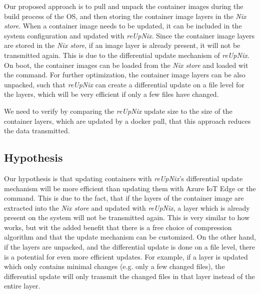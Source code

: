 Our proposed approach is to pull and unpack the container images during the build
process of the \ac{OS}, and then storing the container image layers in the
\textit{Nix store}. When a container image needs to be updated, it can
be included in the system configuration and updated with \textit{reUpNix}.
Since the container image layers are stored in the \textit{Nix store}, if an
image layer is already present, it will not be transmitted again. This is due
to the differential update mechanism of \textit{reUpNix}.
On boot, the container images can be loaded from the \textit{Nix store} and
loaded wit the  command.
For further optimization, the container image layers can be also unpacked,
such that \textit{reUpNix} can create a differential update on a file level for
the layers, which will be very efficient if only a few files have changed.

We need to verify by comparing the \textit{reUpNix} update size to the size of the container layers,
which are updated by a docker pull, that this approach reduces the data transmitted.

\subsection{Hypothesis}
Our hypothesis is that updating containers with \textit{reUpNix}'s differential
update mechanism will be more efficient than updating them with Azure IoT Edge or
the  command. This is due to the fact, that if the
layers of the container image are extracted into the \textit{Nix store} and
updated with \textit{reUpNix}, a layer which is already present on the system
will not be transmitted again. This is very similar to how 
works, but wit the added benefit that there is a free choice of compression
algorithm and that the update mechanism can be customized. On the other hand,
if the layers are unpacked, and the differential update is done on a file level,
there is a potential for even more efficient updates. For example, if a layer
is updated which only contains minimal changes (e.g. only a few
changed files), the differential update will only transmit the changed files in
that layer instead of the entire layer.
